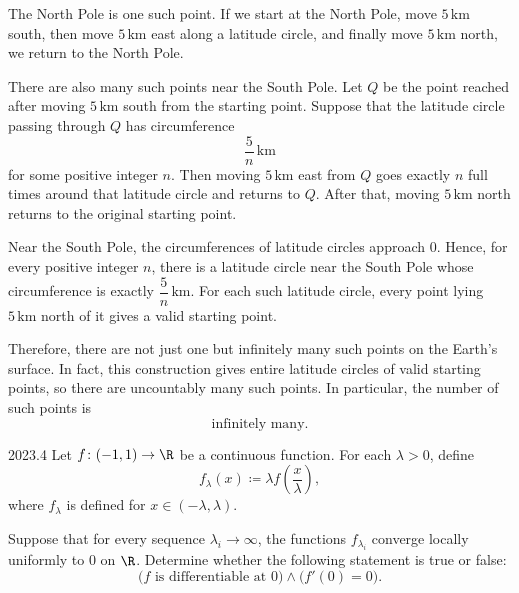     \begin{solution}
        The North Pole is one such point. If we start at the North Pole, move $5\,\mathrm{km}$ south,
        then move $5\,\mathrm{km}$ east along a latitude circle, and finally move $5\,\mathrm{km}$
        north, we return to the North Pole.

        There are also many such points near the South Pole. Let $Q$ be the point reached after
        moving $5\,\mathrm{km}$ south from the starting point. Suppose that the latitude circle
        passing through $Q$ has circumference
        \[
            \frac{5}{n}\,\mathrm{km}
        \]
        for some positive integer $n$. Then moving $5\,\mathrm{km}$ east from $Q$ goes exactly $n$
        full times around that latitude circle and returns to $Q$. After that, moving $5\,\mathrm{km}$
        north returns to the original starting point.

        Near the South Pole, the circumferences of latitude circles approach $0$. Hence, for every
        positive integer $n$, there is a latitude circle near the South Pole whose circumference is
        exactly $\dfrac{5}{n}\,\mathrm{km}$. For each such latitude circle, every point lying
        $5\,\mathrm{km}$ north of it gives a valid starting point.

        Therefore, there are not just one but infinitely many such points on the Earth's surface. In
        fact, this construction gives entire latitude circles of valid starting points, so there are
        uncountably many such points. In particular, the number of such points is
        \[
            \boxed{\text{infinitely many}}.
        \]
    \end{solution}

    \begin{pastproblem}{2023.4}
        Let $f\colon(-1,1)\to\R$ be a continuous function. For each $\lambda>0$, define
        \[
            f_\lambda(x)
            \coloneqq
            \lambda f\left(\frac{x}{\lambda}\right),
        \]
        where $f_\lambda$ is defined for $x\in(-\lambda,\lambda)$.

        Suppose that for every sequence $\lambda_i\to\infty$, the functions $f_{\lambda_i}$ converge
        locally uniformly to $0$ on $\R$. Determine whether the following statement is true or
        false:
        \[
            \bigl(f\text{ is differentiable at }0\bigr)
            \land
            \bigl(f'(0)=0\bigr).
        \]
    \end{pastproblem}

